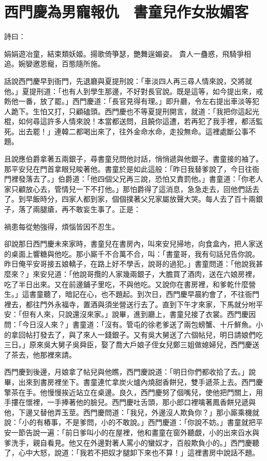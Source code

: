 %

\chapter{西門慶為男寵報仇　書童兒作女妝媚客}

詩曰：

娟娟遊冶童，結束類妖姬。揚歌倚箏瑟，艷舞逞媚姿。
貴人一蠱惑，飛騎爭相追。婉孌邀恩寵，百態隨所施。

話說西門慶早到衙門，先退廳與夏提刑說：「車淡四人再三尋人情來說，交將就他。」夏提刑道：「也有人到學生那邊，不好對長官說。既是這等，如今提出來，戒飭他一番，放了罷。」西門慶道：「長官見得有理。」即升廳，令左右提出車淡等犯人跪下。生怕又打，只顧磕頭。西門慶也不等夏提刑開言，就道：「我把你這起光棍，如何尋這許多人情來說！本當都送問，且饒你這遭，若再犯了我手裡，都活監死。出去罷！」連韓二都喝出來了，往外金命水命，走投無命。這裡處斷公事不題。

且說應伯爵拿著五兩銀子，尋書童兒問他討話，悄悄遞與他銀子。書童接的袖了。那平安兒在門首拿眼兒睃著他。書童於是如此這般：「昨日我替爹說了，今日往衙門裡發落去了。」伯爵道：「他四個父兄再三說，恐怕又責罰他。」書童道：「你老人家只顧放心去，管情兒一下不打他。」那怕爵得了這消息，急急走去，回他們話去了。到早飯時分，四家人都到家，個個撲著父兄家屬放聲大哭。每人去了百十兩銀子，落了兩腿瘡，再不敢妄生事了。正是：

禍患每從勉強得，煩惱皆因不忍生。

卻說那日西門慶未來家時，書童兒在書房內，叫來安兒掃地，向食盒內，把人家送的桌面上響糖與他吃。那小廝千不合萬不合，叫：「書童哥，我有句話兒告你說。昨日俺平安哥接五娘轎子，在路上好不學舌，說哥的過犯。」書童問道：「他說我甚麼來？」來安兒道：「他說哥攬的人家幾兩銀子，大膽買了酒肉，送在六娘房裡，吃了半日出來。又在前邊鋪子里吃，不與他吃。又說你在書房裡，和爹乾什麼營生。」這書童聽了，暗記在心，也不題起。到次日，西門慶早晨約會了，不往衙門裡去，都往門外永福寺，置酒與須坐營送行去了。直到下午才來家，下馬就分咐平安：「但有人來，只說還沒來家。」說畢，進到廳上，書童兒接了衣裳。西門慶因問：「今日沒人來？」書童道：「沒有。管屯的徐老爹送了兩包螃蟹、十斤鮮魚。小的拿回帖打發去了，與了來人一錢銀子。又有吳大舅送了六個帖兒，明日請娘們吃三日。」原來吳大舅子吳舜臣，娶了喬大戶娘子侄女兒鄭三姐做媳婦兒，西門慶送了茶去，他那裡來請。

西門慶到後邊，月娘拿了帖兒與他瞧，西門慶說道：「明日你們都收拾了去。」說畢，出來到書房裡坐下。書童連忙拿炭火爐內燒甜香餅兒，雙手遞茶上去。西門慶擎茶在手。他慢慢挨近站立在桌邊。良久，西門慶努了個嘴兒，使他把門關上，用手摟在懷裡，一手捧著他的臉兒。西門慶吐舌頭，那小郎口裡噙著鳳香餅兒遞與他，下邊又替他弄玉莖。西門慶問道：「我兒，外邊沒人欺負你？」那小廝乘機就說：「小的有樁事，不是爹問，小的不敢說。」西門慶道：「你說不妨。」書童就把平安一節告說一遍：「前日爹叫小的在屋裡，他和畫童在窗外聽覷，小的出來舀水與爹洗手，親自看見。他又在外邊對著人罵小的蠻奴才，百般欺負小的。」西門慶聽了，心中大怒，說道：「我若不把奴才腿卸下來也不算！」這裡書房中說話不題。


